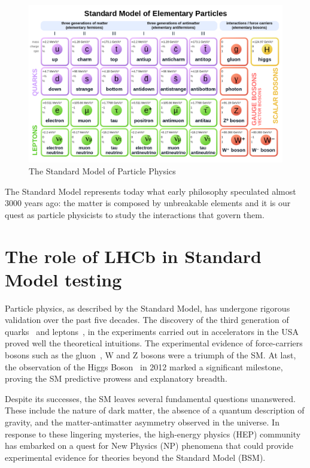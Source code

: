 \begin{figure}
    \centering
    \includegraphics[width=\textwidth]{figures/Standard_Model_of_Elementary_Particles_Anti.svg.png}
    \caption{The Standard Model of Particle Physics}
    \label{fig:SM}
\end{figure}


The Standard Model represents today what early philosophy speculated almost 3000 years ago: the matter is composed by unbreakable elements and it is our quest as particle physicists to study the interactions that govern them.


\section{The role of LHCb in Standard Model testing}
Particle physics, as described by the Standard Model, has undergone rigorous validation over the past five decades. The discovery of the third generation of quarks~\cite{E288:1977xhf, CDF:1995wbb} and leptons~\cite{PhysRevLett.35.1489}, in the experiments carried out in accelerators in the USA proved well the theoretical intuitions. The experimental evidence of force-carriers bosons such as the gluon~\cite{BERGER1979449}, W and Z bosons \cite{UA1:1983mne, UA2:1983mlz} were a triumph of the SM. At last, the  observation of the Higgs Boson~\cite{Aad_2012, Chatrchyan_2012} in 2012 marked a significant milestone, proving the SM predictive prowess and explanatory breadth. 

Despite its successes, the SM leaves several fundamental questions unanswered. These include the nature of dark matter, the absence of a quantum description of gravity, and the matter-antimatter asymmetry observed in the universe. In response to these lingering mysteries, the high-energy physics (HEP) community has embarked on a quest for New Physics (NP) phenomena that could provide experimental evidence for theories beyond the Standard Model (BSM). 

